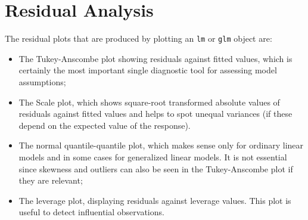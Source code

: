 \documentclass{article}
\providecommand{\T}{\texttt}
\begin{document}
\section{Residual Analysis}
The residual plots that are produced by plotting an \T{lm} or \T{glm}
object are: 
\begin{itemize}
\item 
The Tukey-Anscombe plot showing residuals against fitted values,
which is certainly the most important single diagnostic tool for assessing
model assumptions;
\item
The Scale plot, which shows square-root transformed absolute values of
residuals against 
fitted values and helps to spot unequal variances (if these depend on the
expected value of the response).
\item
The normal quantile-quantile plot, which makes sense only for ordinary
linear models and in some cases for generalized linear models. 
It is not essential since skewness and outliers can also be seen in the
Tukey-Anscombe plot if they are relevant;
\item
The leverage plot, displaying residuals against leverage values.
This plot is useful to detect influential observations.
\end{itemize}
\end{document}

